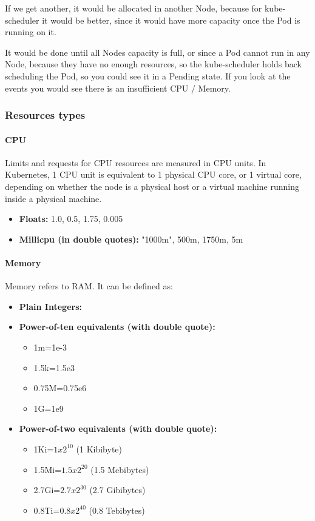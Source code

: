 \documentclass{article}
\begin{document}
If we get another, it would be allocated in another Node, because for kube-scheduler it would be better, since it would have more capacity once the Pod is running on it.

It would be done until all Nodes capacity is full, or since a Pod cannot run in any Node, because they have no enough resources, so the kube-scheduler holds back scheduling the Pod, so you could see it in a Pending state. If you look at the events you would see there is an insufficient CPU / Memory.

\subsubsection{Resources types}
\paragraph{CPU}

Limits and requests for CPU resources are measured in CPU units. In Kubernetes, 1 CPU unit is equivalent to 1 physical CPU core, or 1 virtual core, depending on whether the node is a physical host or a virtual machine running inside a physical machine.
\begin{itemize}
    \item \textbf{Floats:} 1.0, 0.5, 1.75, 0.005
     \item \textbf{Millicpu (in double quotes):} "1000m", 500m, 1750m, 5m
\end{itemize}

\paragraph{Memory}

Memory refers to RAM. It can be defined as:
\begin{itemize}
    \item \textbf{Plain Integers:}
    \item \textbf{Power-of-ten equivalents (with double quote):}
    \begin{itemize}
        \item 1m=1e-3
        \item 1.5k=1.5e3
        \item 0.75M=0.75e6
        \item 1G=1e9
    \end{itemize}
    \item \textbf{Power-of-two equivalents (with double quote):}
    \begin{itemize}
        \item 1Ki=$1x2^{10}$ (1 Kibibyte)
        \item 1.5Mi=$1.5x2^{20}$ (1.5 Mebibytes)
        \item 2.7Gi=$2.7x2^{30}$ (2.7 Gibibytes)
        \item 0.8Ti=$0.8x2^{40}$ (0.8 Tebibytes)
    \end{itemize}
\end{itemize}
\end{document}
